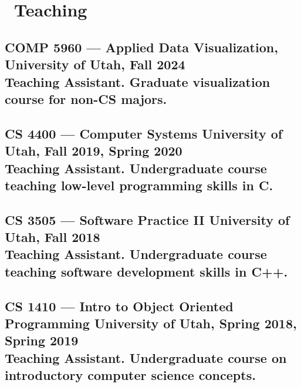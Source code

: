 \section{\faPencil\  Teaching}

\subsection{\normalsize\textbf{COMP 5960 --- Applied Data Visualization,} University of Utah, Fall 2024 \\ Teaching Assistant. Graduate visualization course for non-CS majors.}

\subsection{\normalsize\textbf{CS 4400 --- Computer Systems} University of Utah, Fall 2019, Spring 2020 \\ Teaching Assistant. Undergraduate course teaching low-level programming skills in C.}

\subsection{\normalsize\textbf{CS 3505 --- Software Practice II} University of Utah, Fall 2018 \\ Teaching Assistant. Undergraduate course teaching software development skills in C++.}

\subsection{\normalsize\textbf{CS 1410 --- Intro to Object Oriented Programming} University of Utah, Spring 2018, Spring 2019 \\ Teaching Assistant. Undergraduate course on introductory computer science concepts.}
